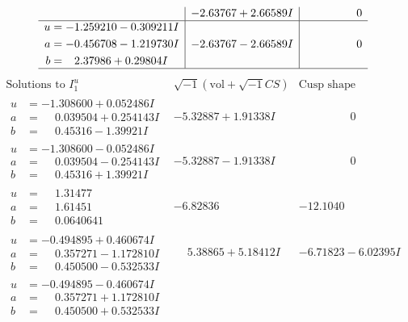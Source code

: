 \documentclass[1p]{elsarticle_modified}
\theoremstyle{definition}
\newcommand{\I}{\sqrt{-1}}
\begin{document}
$$\begin{array}{c|c|c}
 & -2.63767 + 2.66589 I & \phantom{-0.000000 } 0 \\ \hline\begin{aligned}
u &= -1.259210 - 0.309211 I \\
a &= -0.456708 - 1.219730 I \\
b &= \phantom{-}2.37986 + 0.29804 I\end{aligned}
 & -2.63767 - 2.66589 I & \phantom{-0.000000 } 0\\
 \hline 
 \end{array}$$\newpage$$\begin{array}{c|c|c}  
\text{Solutions to }I^u_{1}& \I (\text{vol} + \sqrt{-1}CS) & \text{Cusp shape}\\
 \hline 
\begin{aligned}
u &= -1.308600 + 0.052486 I \\
a &= \phantom{-}0.039504 + 0.254143 I \\
b &= \phantom{-}0.45316 - 1.39921 I\end{aligned}
 & -5.32887 + 1.91338 I & \phantom{-0.000000 } 0 \\ \hline\begin{aligned}
u &= -1.308600 - 0.052486 I \\
a &= \phantom{-}0.039504 - 0.254143 I \\
b &= \phantom{-}0.45316 + 1.39921 I\end{aligned}
 & -5.32887 - 1.91338 I & \phantom{-0.000000 } 0 \\ \hline\begin{aligned}
u &= \phantom{-}1.31477\phantom{ +0.000000I} \\
a &= \phantom{-}1.61451\phantom{ +0.000000I} \\
b &= \phantom{-}0.0640641\phantom{ +0.000000I}\end{aligned}
 & -6.82836\phantom{ +0.000000I} & -12.1040\phantom{ +0.000000I} \\ \hline\begin{aligned}
u &= -0.494895 + 0.460674 I \\
a &= \phantom{-}0.357271 - 1.172810 I \\
b &= \phantom{-}0.450500 - 0.532533 I\end{aligned}
 & \phantom{-}5.38865 + 5.18412 I & -6.71823 - 6.02395 I \\ \hline\begin{aligned}
u &= -0.494895 - 0.460674 I \\
a &= \phantom{-}0.357271 + 1.172810 I \\
b &= \phantom{-}0.450500 + 0.532533 I\end{aligned}

\end{array}$$
\end{document}
